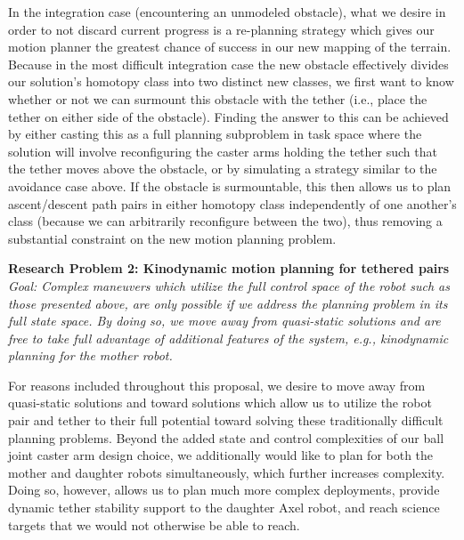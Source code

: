 \documentclass[12pt]{article}
\begin{document}
In the integration case (encountering an unmodeled obstacle), what we desire in order to not discard current 
progress is a re-planning strategy which gives our motion planner the greatest chance of success in 
our new mapping of the terrain. Because in the most 
difficult integration case the new obstacle effectively divides our solution's homotopy class into two distinct 
new classes, we first want to know whether or not we can surmount this obstacle with the tether (i.e., place the 
tether on either side of the obstacle). Finding the answer to this can be achieved by either casting this as a 
full planning subproblem in task space where the solution will involve reconfiguring the caster arms holding the 
tether such that the tether moves above the obstacle, or by simulating a strategy similar to the avoidance case above. 
If the obstacle is surmountable, this then allows us to plan ascent/descent path pairs in either 
homotopy class independently of one another's class (because we can arbitrarily reconfigure between the two), thus 
removing a substantial constraint on the new motion planning problem.

{\bf Research Problem 2: Kinodynamic motion planning for tethered pairs \\}
{\sl Goal: Complex maneuvers which utilize the full control space of the robot such as those presented above, 
are only possible if we address the planning problem in its full state space. By doing so, we move away from quasi-static 
solutions and are free to take full advantage of additional features of the system, e.g., kinodynamic planning for the mother
robot. }

For reasons included throughout this proposal, we desire to move away from quasi-static solutions and 
toward solutions which allow us to utilize the robot pair and tether to their full potential toward solving 
these traditionally difficult planning problems. Beyond the added state and control complexities of our 
ball joint caster arm design choice, we additionally would like to plan for both the mother and daughter 
robots simultaneously, which further increases complexity. Doing so, however, allows us to plan much more complex deployments, 
provide dynamic tether stability support to the daughter Axel robot, and reach science targets that we would not otherwise 
be able to reach.
\end{document}
